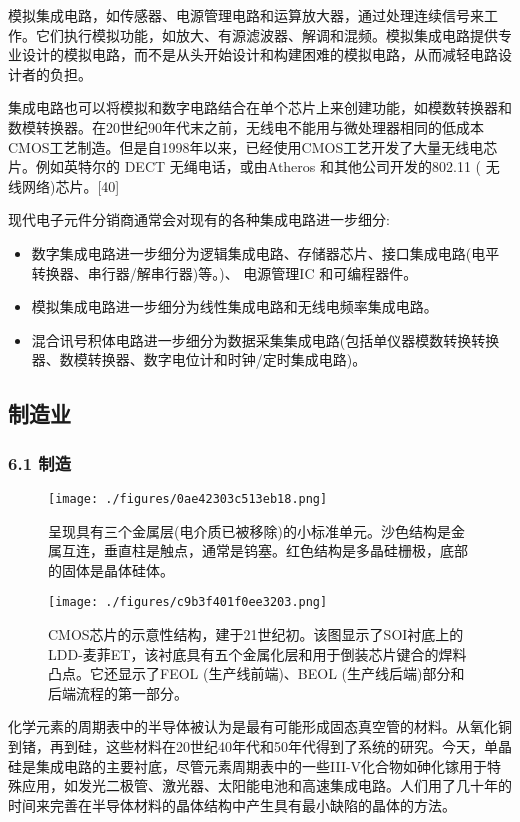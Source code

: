 模拟集成电路，如传感器、电源管理电路和运算放大器，通过处理连续信号来工作。它们执行模拟功能，如放大、有源滤波器、解调和混频。模拟集成电路提供专业设计的模拟电路，而不是从头开始设计和构建困难的模拟电路，从而减轻电路设计者的负担。

集成电路也可以将模拟和数字电路结合在单个芯片上来创建功能，如模数转换器和数模转换器。在20世纪90年代末之前，无线电不能用与微处理器相同的低成本CMOS工艺制造。但是自1998年以来，已经使用CMOS工艺开发了大量无线电芯片。例如英特尔的 DECT 无绳电话，或由Atheros 和其他公司开发的802.11 ( 无线网络)芯片。[40]

现代电子元件分销商通常会对现有的各种集成电路进一步细分:

\begin{itemize}
\item 数字集成电路进一步细分为逻辑集成电路、存储器芯片、接口集成电路(电平转换器、串行器/解串行器)等。)、 电源管理IC 和可编程器件。
\item 模拟集成电路进一步细分为线性集成电路和无线电频率集成电路。
\item 混合讯号积体电路进一步细分为数据采集集成电路(包括单仪器模数转换转换器、数模转换器、数字电位计和时钟/定时集成电路)。
\end{itemize}


\subsection{制造业}

\subsubsection{6.1 制造}

\begin{figure}[ht]
\centering
\texttt{[image: ./figures/0ae42303c513eb18.png]}
\caption{呈现具有三个金属层(电介质已被移除)的小标准单元。沙色结构是金属互连，垂直柱是触点，通常是钨塞。红色结构是多晶硅栅极，底部的固体是晶体硅体。} \label{fig_icJCDL_5}
\end{figure}

\begin{figure}[ht]
\centering
\texttt{[image: ./figures/c9b3f401f0ee3203.png]}
\caption{CMOS芯片的示意性结构，建于21世纪初。该图显示了SOI衬底上的LDD-麦菲ET，该衬底具有五个金属化层和用于倒装芯片键合的焊料凸点。它还显示了FEOL (生产线前端)、BEOL (生产线后端)部分和后端流程的第一部分。} \label{fig_icJCDL_6}
\end{figure}

化学元素的周期表中的半导体被认为是最有可能形成固态真空管的材料。从氧化铜到锗，再到硅，这些材料在20世纪40年代和50年代得到了系统的研究。今天，单晶硅是集成电路的主要衬底，尽管元素周期表中的一些III-V化合物如砷化镓用于特殊应用，如发光二极管、激光器、太阳能电池和高速集成电路。人们用了几十年的时间来完善在半导体材料的晶体结构中产生具有最小缺陷的晶体的方法。

